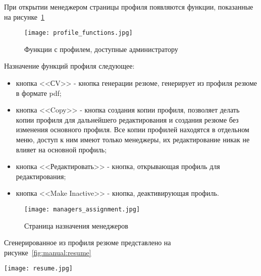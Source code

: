 При открытии менеджером страницы профиля появляются функции, показанные на рисунке~\ref{fig:manual:profile_functions}

\begin{figure}[ht]
  \centering
    \texttt{[image: profile\_functions.jpg]}
    \caption{Функции с профилем, доступные администратору}
    \label{fig:manual:profile_functions}
\end{figure}

\pagebreak

Назначение функций профиля следующее:
\begin{itemize}
	\item кнопка <<СV>> - кнопка генерации резюме, генерирует из профиля резюме в формате pdf;
  \item кнопка <<Copy>> - кнопка создания копии профиля, позволяет делать копии профиля для дальнейшего редактирования
  и создания резюме без изменения основного профиля. Все копии профилей находятся в отдельном меню, доступ к ним имеют
  только менеджеры, их редактирование никак не влияет на основной профиль;
	\item кнопка <<Редактировать>> - кнопка, открывающая профиль для редактирования;
	\item кнопка <<Make Inactive>> - кнопка, деактивирующая профиль.
\end{itemize}

\begin{figure}[ht]
  \centering
    \texttt{[image: managers\_assignment.jpg]}
    \caption{Страница назначения менеджеров}
    \label{fig:manual:managers_assignment}
\end{figure}

Сгенерированное из профиля резюме представлено на рисунке~\ref{fig:manual:resume}

\begin{sidewaysfigure}
  \centering
    \texttt{[image: resume.jpg]}
    \caption{Страница назначения менеджеров}
    \label{fig:manual:resume}
\end{sidewaysfigure}

